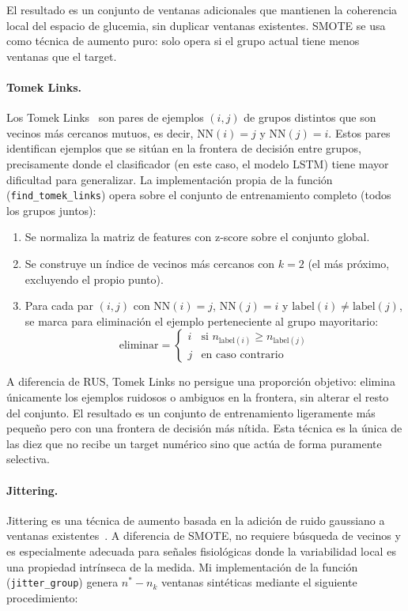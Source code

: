 El resultado es un conjunto de ventanas adicionales que mantienen la coherencia local del espacio de glucemia, sin duplicar ventanas existentes. SMOTE se usa como técnica de aumento puro: solo opera si el grupo actual tiene menos ventanas que el target.

\paragraph{Tomek Links.}
Los Tomek Links~\cite{tomek1976two} son pares de ejemplos $(i, j)$ de grupos distintos que son vecinos más cercanos mutuos, es decir, $\text{NN}(i) = j$ y $\text{NN}(j) = i$. Estos pares identifican ejemplos que se sitúan en la frontera de decisión entre grupos, precisamente donde el clasificador (en este caso, el modelo LSTM) tiene mayor dificultad para generalizar. La implementación propia de la función (\texttt{find\_tomek\_links}) opera sobre el conjunto de entrenamiento completo (todos los grupos juntos):

\begin{enumerate}
  \item Se normaliza la matriz de features con z-score sobre el conjunto global.
  \item Se construye un índice de vecinos más cercanos con $k=2$ (el más próximo, excluyendo el propio punto).
  \item Para cada par $(i, j)$ con $\text{NN}(i) = j$, $\text{NN}(j) = i$ y $\text{label}(i) \neq \text{label}(j)$, se marca para eliminación el ejemplo perteneciente al grupo mayoritario:
  \begin{equation}
    \text{eliminar} = \begin{cases} i & \text{si } n_{\text{label}(i)} \geq n_{\text{label}(j)} \\ j & \text{en caso contrario} \end{cases}
    \label{eq:tomek_rule}
  \end{equation}
\end{enumerate}

A diferencia de RUS, Tomek Links no persigue una proporción objetivo: elimina únicamente los ejemplos ruidosos o ambiguos en la frontera, sin alterar el resto del conjunto. El resultado es un conjunto de entrenamiento ligeramente más pequeño pero con una frontera de decisión más nítida. Esta técnica es la única de las diez que no recibe un target numérico sino que actúa de forma puramente selectiva.

\paragraph{Jittering.}
Jittering es una técnica de aumento basada en la adición de ruido gaussiano a ventanas existentes~\cite{um2017data}. A diferencia de SMOTE, no requiere búsqueda de vecinos y es especialmente adecuada para señales fisiológicas donde la variabilidad local es una propiedad intrínseca de la medida. Mi implementación de la función (\texttt{jitter\_group}) genera $n^* - n_k$ ventanas sintéticas mediante el siguiente procedimiento:

